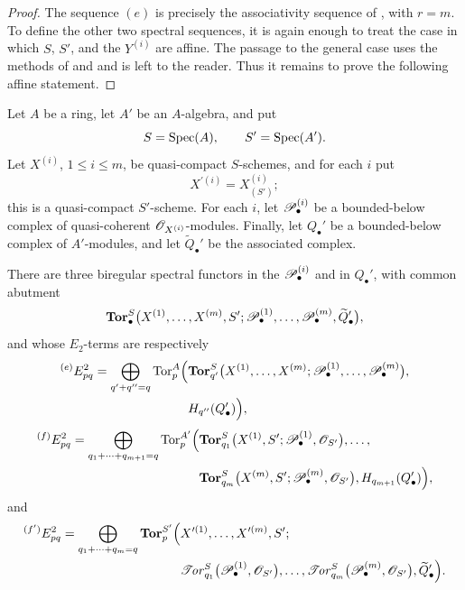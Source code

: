 \begin{proof}
The sequence $(e)$ is precisely the associativity sequence of
, with $r=m$.  To define the other two spectral
sequences, it is again enough to treat the case in which $S$, $S'$,
and the $Y^{(i)}$ are affine.  The passage to the general case uses
the methods of  and  and is left to
the reader.  Thus it remains to prove the following affine
statement.
\end{proof}

\begin{corollary}[6.9.4]
\label{III.6.9.4}
Let $A$ be a ring, let $A'$ be an $A$-algebra, and put
\[
  S=\operatorname{Spec}(A),
  \qquad
  S'=\operatorname{Spec}(A').
\]
Let $X^{(i)}$, $1\leq i\leq m$, be quasi-compact $S$-schemes, and
for each $i$ put
\[
  X^{\prime(i)}=X_{(S')}^{(i)};
\]
this is a quasi-compact $S'$-scheme.  For each $i$, let
$\mathscr{P}_\bullet^{(i)}$ be a bounded-below complex of quasi-coherent
$\mathscr{O}_{X^{(i)}}$-modules.  Finally, let $Q_\bullet'$ be a
bounded-below complex of $A'$-modules, and let
$\widetilde Q_\bullet'$ be the associated complex.

There are three biregular spectral functors in the
$\mathscr{P}_\bullet^{(i)}$ and in $Q_\bullet'$, with common abutment
\[
  \mathbf{Tor}_\bullet^S
  \bigl(
    X^{(1)},\ldots,X^{(m)},S';
    \mathscr{P}_\bullet^{(1)},\ldots,\mathscr{P}_\bullet^{(m)},
    \widetilde Q_\bullet'
  \bigr),
\]
and whose $E_2$-terms are respectively
\[
\begin{split}
  {}^{(e)}E_{pq}^2
  =
  \bigoplus_{q'+q''=q}
  \operatorname{Tor}_p^A
  \Bigl(
    &
    \mathbf{Tor}_{q'}^S
    \bigl(
      X^{(1)},\ldots,X^{(m)};
      \mathscr{P}_\bullet^{(1)},\ldots,\mathscr{P}_\bullet^{(m)}
    \bigr),
    \\
    &
    H_{q''}(Q_\bullet')
  \Bigr),
\end{split}
\]
\[
\begin{split}
  {}^{(f)}E_{pq}^2
  =
  \bigoplus_{q_1+\cdots+q_{m+1}=q}
  \operatorname{Tor}_p^{A'}
  \Bigl(
    &
    \mathbf{Tor}_{q_1}^S
    \bigl(
      X^{(1)},S';
      \mathscr{P}_\bullet^{(1)},\mathscr{O}_{S'}
    \bigr),
    \ldots,
    \\
    &
    \mathbf{Tor}_{q_m}^S
    \bigl(
      X^{(m)},S';
      \mathscr{P}_\bullet^{(m)},\mathscr{O}_{S'}
    \bigr),
    H_{q_{m+1}}(Q_\bullet')
  \Bigr),
\end{split}
\]
and
\[
\begin{split}
  {}^{(f')}E_{pq}^2
  =
  \bigoplus_{q_1+\cdots+q_m=q}
  \mathbf{Tor}_p^{S'}
  \Bigl(
    &
    X^{\prime(1)},\ldots,X^{\prime(m)},S';
    \\
    &
    \mathscr{T}\!\mathit{or}_{q_1}^S
    \bigl(
      \mathscr{P}_\bullet^{(1)},\mathscr{O}_{S'}
    \bigr),
    \ldots,
    \mathscr{T}\!\mathit{or}_{q_m}^S
    \bigl(
      \mathscr{P}_\bullet^{(m)},\mathscr{O}_{S'}
    \bigr),
    \widetilde Q_\bullet'
  \Bigr).
\end{split}
\]
\end{corollary}

